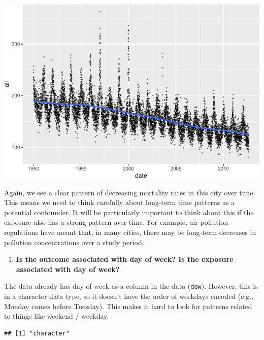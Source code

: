 \documentclass[
]{book}
\newenvironment{Shaded}{\begin{snugshade}}{\end{snugshade}}
\newcommand{\FunctionTok}[1]{\textcolor[rgb]{0.00,0.00,0.00}{#1}}
\newcommand{\NormalTok}[1]{#1}
\newcommand{\SpecialCharTok}[1]{\textcolor[rgb]{0.00,0.00,0.00}{#1}}
\providecommand{\tightlist}{%
  \setlength{\itemsep}{0pt}\setlength{\parskip}{0pt}}
\begin{document}
\includegraphics{adv_epi_analysis_files/figure-latex/unnamed-chunk-15-1.pdf}

Again, we see a clear pattern of decreasing mortality rates in this city over time.
This means we need to think carefully about long-term time patterns as a potential
confounder. It will be particularly important to think about this if the exposure
also has a strong pattern over time. For example, air pollution regulations have
meant that, in many cities, there may be long-term decreases in pollution
concentrations over a study period.

\begin{enumerate}
\def\labelenumi{\arabic{enumi}.}
\setcounter{enumi}{4}
\tightlist
\item
  \textbf{Is the outcome associated with day of week? Is the exposure associated
  with day of week?}
\end{enumerate}

The data already has day of week as a column in the data (\texttt{dow}). However,
this is in a character data type, so it doesn't have the order of weekdays
encoded (e.g., Monday comes before Tuesday). This makes it hard to look for
patterns related to things like weekend / weekday.

\begin{Shaded}
\end{Shaded}

\begin{verbatim}
## [1] "character"
\end{verbatim}
\end{document}
